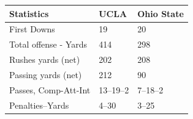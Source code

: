\documentclass{article}
\begin{document}
\begin{tabular}{lll}
\toprule
Statistics & UCLA & Ohio State \\
\midrule
First Downs & 19 & 20 \\
Total offense - Yards & 414 & 298 \\
Rushes yards (net) & 202 & 208 \\
Passing yards (net) & 212 & 90 \\
Passes, Comp-Att-Int & 13–19–2 & 7–18–2 \\
Penalties–Yards & 4–30 & 3–25 \\
\bottomrule
\end{tabular}
\end{document}
